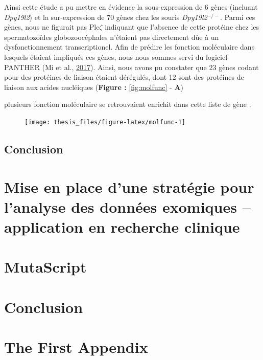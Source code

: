 \documentclass[12pt,twoside]{reedthesis}
\theoremstyle{definition}
\theoremstyle{definition}
\theoremstyle{remark}
\begin{document}
  Ainsi cette étude a pu mettre en évidence la sous-expression de 6 gènes
  (incluant \emph{Dpy19l2}) et la sur-expression de 70 gènes chez les
  souris \emph{Dpy19l2}\(^{-/-}\). Parmi ces gènes, nous ne figurait pas
  Plc\(\zeta\) indiquant que l'absence de cette protéine chez les
  spermatozoïdes globozoocéphales n'étaient pas directement dûe à un
  dysfonctionnement transcriptionel. Afin de prédire les fonction
  moléculaire dans lesquels étaient impliqués ces gènes, nous nous sommes
  servi du logiciel PANTHER (Mi et al.,
  \protect\hyperlink{ref-Mi2017}{2017}). Ainsi, nous avons pu constater
  que 23 gènes codant pour des protéines de liaison étaient dérégulés,
  dont 12 sont des protéines de liaison aux acides nucléiques
  (\textbf{Figure : }\ref{fig:molfunc} - \textbf{A})
  
  plusieurs fonction moléculaire se retrouvaient enrichit dans cette liste
  de gène .
  
  \begin{figure}
  
  {\centering \texttt{[image: thesis\_files/figure-latex/molfunc-1]} 
  
  }
  
  \end{figure}
  
  \section{Conclusion}\label{conclusion}
  
  \chapter{Mise en place d'une stratégie pour l'analyse des données
  exomiques -- application en recherche
  clinique}\label{mise-en-place-dune-strategie-pour-lanalyse-des-donnees-exomiques-application-en-recherche-clinique}
  
  \chapter{MutaScript}\label{mutascript}
  
  \chapter*{Conclusion}\label{conclusion-1}
  
  \chapter{The First Appendix}\label{the-first-appendix}
  
\end{document}
